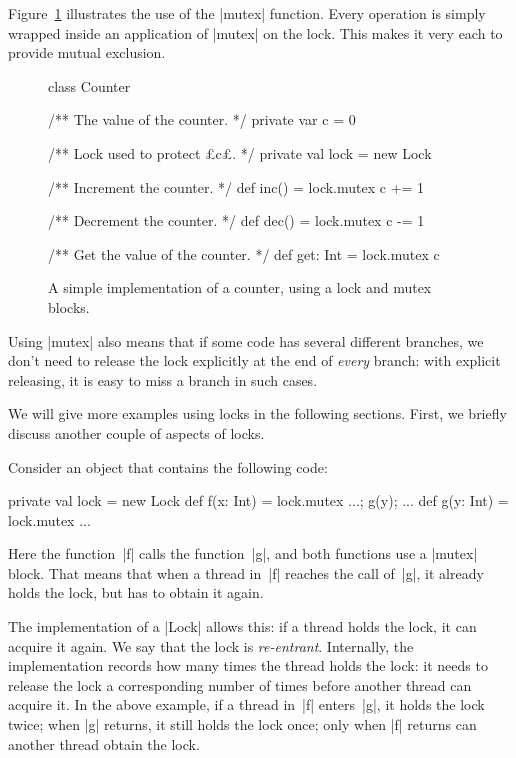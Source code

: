 Figure~\ref{fig:counter-lock} illustrates the use of the |mutex| function.
Every operation is simply wrapped inside an application of |mutex| on the
lock.  This makes it very each to provide mutual exclusion.  


\begin{figure}
\begin{scala}
class Counter{
  /** The value of the counter. */
  private var c = 0

  /** Lock used to protect £c£. */
  private val lock = new Lock

  /** Increment the counter. */
  def inc() = lock.mutex{ c += 1 }

  /** Decrement the counter. */
  def dec() = lock.mutex{ c -= 1 }

  /** Get the value of the counter. */
  def get: Int = lock.mutex{ c}
}
\end{scala}
\caption{A simple implementation of a counter, using a lock and {\scalashape
    mutex} blocks.}
\label{fig:counter-lock}
\end{figure}


Using |mutex| also means that if some code has several different branches, we
don't need to release the lock explicitly at the end of \emph{every} branch:
with explicit releasing, it is easy to miss a branch in such cases. 



We will give more examples using locks in the following sections.  First,
we briefly discuss another couple of aspects of locks.  

Consider an object that contains the following code:
%
\begin{scala}
  private val lock = new Lock
  def f(x: Int) = lock.mutex{ ...; g(y); ... }
  def g(y: Int) = lock.mutex{ ... }
\end{scala}
%
Here the function~|f| calls the function~|g|, and both functions use a |mutex|
block.  That means that when a thread in~|f| reaches the call of~|g|, it
already holds the lock, but has to obtain it again.

The implementation of a |Lock| allows this: if a thread holds the lock, it can
acquire it again.  We say that the lock is \emph{re-entrant}.  Internally, the
implementation records how many times the thread holds the lock: it needs to
release the lock a corresponding number of times before another thread can
acquire it.  In the above example, if a thread in~|f| enters~|g|, it holds the
lock twice; when |g| returns, it still holds the lock once; only when |f|
returns can another thread obtain the lock.

